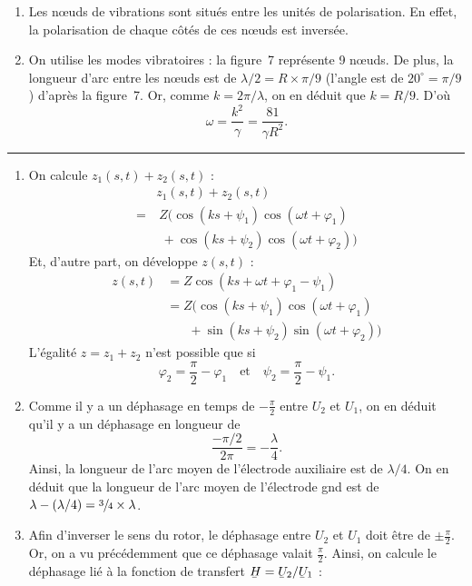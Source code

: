 \documentclass[a4paper]{article}
\begin{document}
\begin{multicols}{2}
		\begin{enumerate}[label=({\it\alph*\/})]
			\item Les nœuds de vibrations sont situés entre les unités de polarisation. En effet, la polarisation de chaque côtés de ces nœuds est inversée.
			\item On utilise les modes vibratoires : la figure~7 représente 9 nœuds. De plus, la longueur d'arc entre les nœuds est de $\lambda / 2 = R\times \pi/9$ (l'angle est de $20^\circ = \pi/9$) d'après la figure~7. Or, comme $k = 2\pi / \lambda$, on en déduit que $k = R / 9$. D'où \[\omega = \frac{k^2}{\gamma} = \frac{81}{\gamma R^2}.\]
		\end{enumerate}
		\quad\hrule
		\begin{enumerate}[label=({\it\alph*\/})]
			\item On calcule $z_1(s,t) + z_2(s,t)$\/ :
				\begin{align*}
					&z_1(s,t) + z_2(s,t)\\
					=&\: Z\big(\cos(k s + \psi_1)\cos(\omega t + \varphi_1)\\
										&\:\,+ \cos(k s + \psi_2)\cos(\omega t + \varphi_2)\big)
				\end{align*}
				Et, d'autre part, on développe $z(s,t)$\/ :
				\begin{align*}
					z(s,t) &= Z\cos(ks + \omega t + \varphi_1 - \psi_1)\\
					&= Z\big(\cos(k s + \psi_1)\cos(\omega t + \varphi_1)\\
										&\mathrel{\phantom{=}}\:\,+ \sin(k s + \psi_2)\sin(\omega t + \varphi_2)\big)
				\end{align*}
				L'égalité $z = z_1 + z_2$\/ n'est possible que si \[\varphi_2 = \frac{\pi}{2} - \varphi_1\quad\text{et}\quad\psi_2 = \frac{\pi}{2} - \psi_1.\]
			\item Comme il y a un déphasage en temps de $-\frac{\pi}{2}$\/ entre $U_2$\/ et $U_1$, on en déduit qu'il y a un déphasage en longueur de \[
					\frac{-\pi / 2}{2\pi} = -\frac{\lambda}{4}
				.\]
				Ainsi, la longueur de l'arc moyen de l'électrode auxiliaire est de $\lambda / 4$. On en déduit que la longueur de l'arc moyen de l'électrode {\sc gnd}\/ est de $\lambda - (\lambda / 4) = \sfrac{3}{4}\times \lambda$.
			\item Afin d'inverser le sens du rotor, le déphasage entre $U_2$\/ et $U_1$\/ doit être de $\pm\frac{\pi}{2}$. Or, on a vu précédemment que ce déphasage valait $\frac{\pi}{2}$. Ainsi, on calcule le déphasage lié à la fonction de transfert $\ubar{H} = \ubar{U}_2 / \ubar{U}_1$\/ :

\end{enumerate}
\end{multicols}
\end{document}
